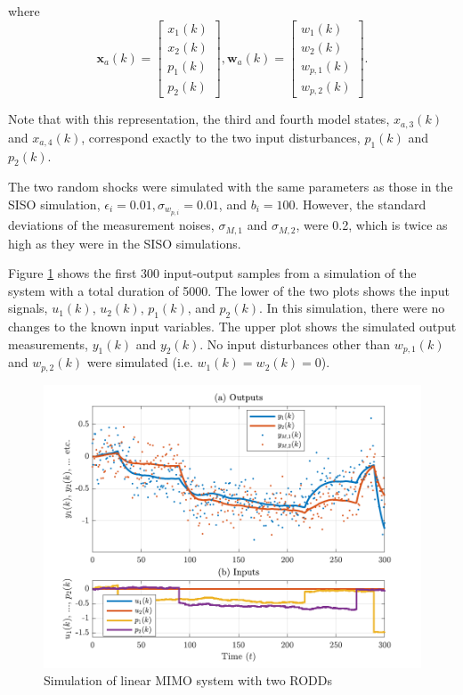 where
\begin{equation} \label{eq:sim-sys-2x2-ss-aug2}
	\mathbf{x}_{a}(k) = \left[\begin{array}{l}
		x_{1}(k) \\
		x_{2}(k) \\
		p_{1}(k) \\
		p_{2}(k)
	\end{array}\right], \mathbf{w}_{a}(k) = \left[\begin{array}{l}
		w_1(k) \\
		w_2(k) \\
		w_{p,1}(k) \\
		w_{p,2}(k)
	\end{array}\right].
\end{equation}

Note that with this representation, the third and fourth model states, $x_{a,3}(k)$ and $x_{a,4}(k)$, correspond exactly to the two input disturbances, $p_1(k)$ and $p_2(k)$.

The two random shocks were simulated with the same parameters as those in the \gls{SISO} simulation, $\epsilon_i=0.01, \sigma_{w_{p,i}}=0.01$, and $b_i=100$. However, the standard deviations of the measurement noises, $\sigma_{M,1}$ and $\sigma_{M,2}$, were 0.2, which is twice as high as they were in the \gls{SISO} simulations.

Figure \ref{fig:rod-obs-sim-2-ioplot} shows the first 300 input-output samples from a simulation of the system with a total duration of 5000. The lower of the two plots shows the input signals, $u_1(k)$, $u_2(k)$, $p_1(k)$, and $p_2(k)$. In this simulation, there were no changes to the known input variables. The upper plot shows the simulated output measurements, $y_1(k)$ and $y_2(k)$. No input disturbances other than $w_{p,1}(k)$ and $w_{p,2}(k)$ were simulated (i.e. $w_1(k)=w_2(k)=0$).
\begin{figure}[htp]
	\centering
	\includegraphics[width=13cm]{images/rod_obs_sim3_all_seed_ioplot.pdf}
	\caption{Simulation of linear MIMO system with two \gls{RODD}s}
	\label{fig:rod-obs-sim-2-ioplot}
\end{figure}


